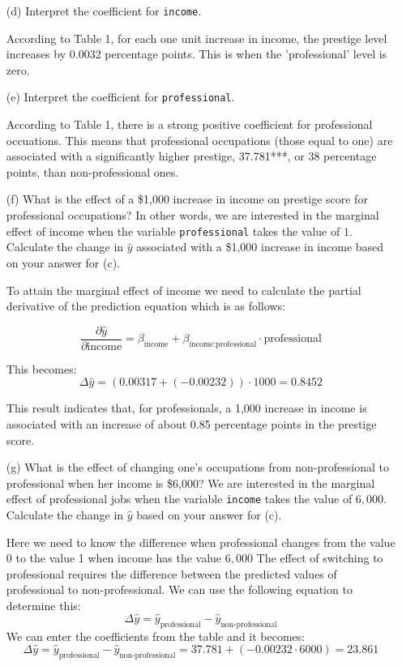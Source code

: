 \documentclass[12pt,letterpaper]{article}
\begin{document}
\begin{enumerate}
	
	\item [(d)]
	Interpret the coefficient for \texttt{income}.
	
	 According to Table 1, for each one unit increase in income, the prestige level increases by 0.0032 percentage points. This is when the 'professional' level is zero. 
	 
	\vspace{.5cm}	
	\item [(e)]
	Interpret the coefficient for \texttt{professional}.
	
	According to Table 1, there is a strong positive coefficient for professional occuations. This means that  professional occupations (those equal to one) are associated with a significantly higher prestige, 37.781***, or 38 percentage points, than non-professional ones.
	
	\newpage
	\item [(f)]
	What is the effect of a \$1,000 increase in income on prestige score for professional occupations? In other words, we are interested in the marginal effect of income when the variable \texttt{professional} takes the value of $1$. Calculate the change in $\hat{y}$ associated with a \$1,000 increase in income based on your answer for (c).
	
	To attain the marginal effect of income we need to calculate the partial derivative of the prediction equation which is as follows: 
	
	\[
	\frac{\partial \hat{y}}{\partial \text{income}} = \beta_{\text{income}} + \beta_{\text{income}:\text{professional}} \cdot \text{professional}
	\]
	
	This becomes: 
	\[
	\Delta \hat{y} = (0.00317 + (-0.00232)) \cdot 1000 = 0.8452
	\]
	
	
	This result indicates that, for professionals, a 1,000 increase in income is associated with an increase of about 0.85 percentage points in the prestige score. 
	
		 
	\vspace{1cm}
	
	
	\item [(g)]
	What is the effect of changing one's occupations from non-professional to professional when her income is \$6,000? We are interested in the marginal effect of professional jobs when the variable \texttt{income} takes the value of $6,000$. Calculate the change in $\hat{y}$ based on your answer for (c).
	
	Here we need to know the difference when professional changes from the value 0 to the value 1 when income has the value $6,000$ 
	The effect of switching to professional requires the difference between the predicted values of professional to non-professional. We can use the following equation to determine this: 
	\[
	\Delta \hat{y} = \hat{y}_{\text{professional}} - \hat{y}_{\text{non-professional}}
	\]
	We can enter the coefficients from the table and it becomes: 
	\[
	\Delta \hat{y} = \hat{y}_{\text{professional}} - \hat{y}_{\text{non-professional}} = 37.781 + (-0.00232 \cdot 6000) = 23.861
	\]
	

\end{enumerate}
\end{document}
